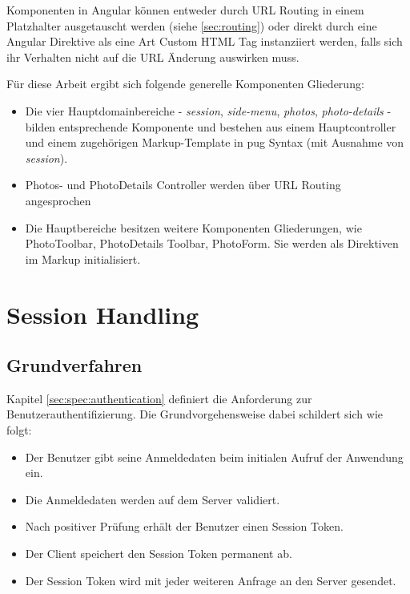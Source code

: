 Komponenten in Angular können entweder durch URL Routing in einem Platzhalter ausgetauscht werden (siehe \ref{sec:routing}) oder direkt durch eine Angular Direktive als eine Art Custom HTML Tag instanziiert werden, falls sich ihr Verhalten nicht auf die URL Änderung auswirken muss.

Für diese Arbeit ergibt sich folgende generelle Komponenten Gliederung:

\begin{itemize}
\item Die vier Hauptdomainbereiche - \emph{session}, \emph{side-menu}, \emph{photos}, \emph{photo-details} - bilden entsprechende Komponente und bestehen aus einem Hauptcontroller und einem zugehörigen Markup-Template in \gls{pug} Syntax (mit Ausnahme von \emph{session}).
\item Photos- und PhotoDetails Controller werden über URL Routing angesprochen
\item Die Hauptbereiche besitzen weitere Komponenten Gliederungen, wie PhotoToolbar, PhotoDetails Toolbar, PhotoForm. Sie werden als Direktiven im Markup initialisiert.
\end{itemize}

\section{Session Handling}

\subsection{Grundverfahren}
\label{sec:session_handling_basics}

Kapitel \ref{sec:spec:authentication} definiert die Anforderung zur Benutzerauthentifizierung. Die Grundvorgehensweise dabei schildert sich wie folgt:

\begin{itemize}
  \item Der Benutzer gibt seine Anmeldedaten beim initialen Aufruf der Anwendung ein.
  \item Die Anmeldedaten werden auf dem Server validiert.
  \item Nach positiver Prüfung erhält der Benutzer einen Session Token.
  \item Der Client speichert den Session Token permanent ab.
  \item Der Session Token wird mit jeder weiteren Anfrage an den Server gesendet.
\end{itemize}


